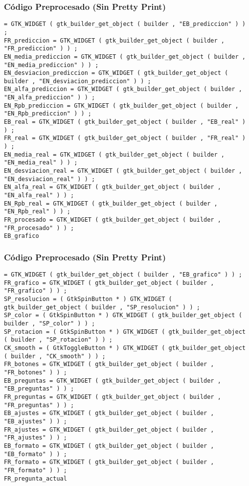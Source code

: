 \documentclass{beamer}
\begin{document}
\begin{frame}[fragile]
\frametitle{C\'odigo Preprocesado (Sin Pretty Print)}
\begin{lstlisting}[style=CStyle]
= GTK_WIDGET ( gtk_builder_get_object ( builder , "EB_prediccion" ) ) ; 
FR_prediccion = GTK_WIDGET ( gtk_builder_get_object ( builder , "FR_prediccion" ) ) ; 
EN_media_prediccion = GTK_WIDGET ( gtk_builder_get_object ( builder , "EN_media_prediccion" ) ) ; 
EN_desviacion_prediccion = GTK_WIDGET ( gtk_builder_get_object ( builder , "EN_desviacion_prediccion" ) ) ; 
EN_alfa_prediccion = GTK_WIDGET ( gtk_builder_get_object ( builder , "EN_alfa_prediccion" ) ) ; 
EN_Rpb_prediccion = GTK_WIDGET ( gtk_builder_get_object ( builder , "EN_Rpb_prediccion" ) ) ; 
EB_real = GTK_WIDGET ( gtk_builder_get_object ( builder , "EB_real" ) ) ; 
FR_real = GTK_WIDGET ( gtk_builder_get_object ( builder , "FR_real" ) ) ; 
EN_media_real = GTK_WIDGET ( gtk_builder_get_object ( builder , "EN_media_real" ) ) ; 
EN_desviacion_real = GTK_WIDGET ( gtk_builder_get_object ( builder , "EN_desviacion_real" ) ) ; 
EN_alfa_real = GTK_WIDGET ( gtk_builder_get_object ( builder , "EN_alfa_real" ) ) ; 
EN_Rpb_real = GTK_WIDGET ( gtk_builder_get_object ( builder , "EN_Rpb_real" ) ) ; 
FR_procesado = GTK_WIDGET ( gtk_builder_get_object ( builder , "FR_procesado" ) ) ; 
EB_grafico \end{lstlisting}
\end{frame}
\begin{frame}[fragile]
\frametitle{C\'odigo Preprocesado (Sin Pretty Print)}
\begin{lstlisting}[style=CStyle]
= GTK_WIDGET ( gtk_builder_get_object ( builder , "EB_grafico" ) ) ; 
FR_grafico = GTK_WIDGET ( gtk_builder_get_object ( builder , "FR_grafico" ) ) ; 
SP_resolucion = ( GtkSpinButton * ) GTK_WIDGET ( gtk_builder_get_object ( builder , "SP_resolucion" ) ) ; 
SP_color = ( GtkSpinButton * ) GTK_WIDGET ( gtk_builder_get_object ( builder , "SP_color" ) ) ; 
SP_rotacion = ( GtkSpinButton * ) GTK_WIDGET ( gtk_builder_get_object ( builder , "SP_rotacion" ) ) ; 
CK_smooth = ( GtkToggleButton * ) GTK_WIDGET ( gtk_builder_get_object ( builder , "CK_smooth" ) ) ; 
FR_botones = GTK_WIDGET ( gtk_builder_get_object ( builder , "FR_botones" ) ) ; 
EB_preguntas = GTK_WIDGET ( gtk_builder_get_object ( builder , "EB_preguntas" ) ) ; 
FR_preguntas = GTK_WIDGET ( gtk_builder_get_object ( builder , "FR_preguntas" ) ) ; 
EB_ajustes = GTK_WIDGET ( gtk_builder_get_object ( builder , "EB_ajustes" ) ) ; 
FR_ajustes = GTK_WIDGET ( gtk_builder_get_object ( builder , "FR_ajustes" ) ) ; 
EB_formato = GTK_WIDGET ( gtk_builder_get_object ( builder , "EB_formato" ) ) ; 
FR_formato = GTK_WIDGET ( gtk_builder_get_object ( builder , "FR_formato" ) ) ; 
FR_pregunta_actual \end{lstlisting}
\end{frame}
\end{document}
